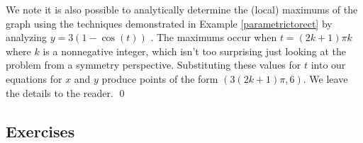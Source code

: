 \documentclass{ximera}
\begin{document}
\begin{ex}
\smallskip

We note it is also possible to analytically determine  the (local) maximums of the graph using the techniques demonstrated in Example \ref{parametrictorect}  by analyzing $y = 3(1-\cos(t))$ .   The maximums occur when $t = (2k +1) \pi k$ where $k$ is a nonnegative integer, which isn't too surprising just looking at the problem from a  symmetry perspective.  Substituting these values for $t$ into our equations for $x$ and $y$ produce points of the form $(3(2k+1) \pi, 6)$.  We leave the details to the reader.  \qed

\end{ex}



\newpage

\subsection{Exercises}



\closegraphsfile
\end{document}
